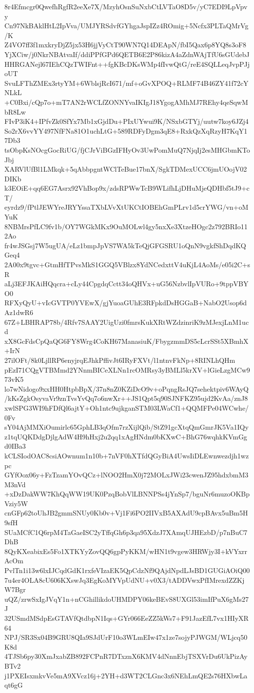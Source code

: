 8r4Efmcgr0QwefhRgfR2eeXe7X/MzyhOsnSuNxbCtLVTaO8D5v/yC7EDI9LpVpvy
Cn97NkBAklHtL2IpVva/UMJYRSdvfGYhgaJspIZz4ROmig+5Ncfx3PLTaQMrVg/K
Z4VO7ff3f1mxkryDjZ5jx53H6jjVyCtT90WN7Q14DEApN/fbI5Qax6p8YQ8s3oF8
YjXCiw/j0NkrNBAtvaIf/ddiPPfGPd6QETB6E2P86kizA4aZdnWAjTfU6sGUdebJ
HHRGANejl67IEhCQzTWIFnt++fgKBcDKsWMp4fIvwQtG/reE4SQLLeqJvpPJjoUT
SvuLFThZMEx3rtyYM+6WblsjRcI671/mf+oGvXPOQ+RLMF74B46ZY41f72cYNLkL
+C0Bxi/cQp7o+mT7AN2rWCLfZONNYvaIKIgJ18YgogAMhMJ7REhy4qeSqwMbR8Lw
FIvP3iK4+IPfvZk0SfYx7Mb1xGjdDu+PIxUYwui9K/NSxbGTYj/uutw7koy6JZj4
So2rX6vvYY497NfFNa81O1uchLtG+589RDFyDgm3qE8+RxkQzXqRzyH7KqY17Db3
tsObpKsNOcgGocRiUG/fjCJrViBGzIFHyOv3UwPomMuQ7NjqIj2esMHGbmKToJbj
XARVlUfBl1LMkqk+5qAbbpgntWClTeBue17bnX/SgkTDMexUCC6jmUOojV02DIKb
k3EOiE+qq6EG7Asrx92VhBop9x/zdsRPWwTcB9WLifhLjDHuMjeQDHbf5tJ9+cT/
eyrdz9/fPtlJEWYreJRYYssaTXbLVvXtUKCtIOBEhGmPLrv1d5crYWG/vn+oMYuK
8NBMrsPfLC9fv1b/OY7WGkMKx9OuMOLwl4gy5nxXe3XtzeHOgc2z792BRIo112Ao
fr4wJSGsj7W5ugUA/eLz1bmpJpVS7WA5kTeQjGFGSRU1oQnN9vgkfShDqdKQGeq4
2A00x9tgvc+GtmHfTPvsMkS1GGQ5VBlzx8YdNCedxttV4uKjL4AoMs/e05i2C+sR
aLj3EFJKAiHQqcra+cLy44CpgdqCctt34oQHVx+uG56NzbvlIpVURo+9tppVBYO0
RFXyQyU+vIcGVTP0YVEwX/gjYuoaGUhE3RFpkdDsHGGaB+NabO2Usop6dAz1dwR6
67Z+LBHRAP78b/4Rfv7SAAY2UigUzi0fmrsKukXRtWZdzinriK9zMJexjLnM1ucd
xX8GcFdsCpQaQG6FY8Wrg4CoKH67ManasiuK/FbygzmmDS5cLcrSSt5XBmhX+IrN
27ilOFt/8k0LjllRP6enyjrqEJhkPffivJt6IRyFXVt/l1ntnvFkNp+8RINLhQHm
pEzI71CQgVTBMmd2YNnmBICeXLNn1rcOMRsy3yBMLl5krXV+lGieLzgMCw973vK5
lo7wNidogo9xxHH0HtpbBpX/37n8nZ0KZiDcO9v+oPqngRsJQ7sehektpiv6WAyQ
/kKsZgkOsyvaVr9znTvsYvQq7o6nwXr++JS1Qpt5q90SJNFKZ95ujd2KvAa/znJ8
xwlSPG3WI9hFDfQl6ajtY+Oh1ntc9ujkganSTM03LWaCf1+QQMFPe04WCwhe/0Fv
sY04AjMMXiOumirlc65GphLB3qOfm7rzXijlQib/StZ91gcXtqQmGmrJK5Va1IQy
z1tqUQKDdgDjlgAdW4H9hHxj2u2qq1xAgHNdm0bKXwC+BhG76wqhkKVmGgd0IBa3
kCLSIodOAC8csiAOwnum1n10b+7nVF0hXTfdQGyBiA4UwsIiDLEwnwezdjh1wzpc
GYfOox06y+FzTzamYOvQCz+lNOO2HmX0j72MOLxJWi23cwenJZ95hdxbmM3M3nVd
+xDzDakWW7KhQqWW19UK0PzqBobVlLBNNPSs4jYnSp7/bguNr6muzoOKBpVziy5W
cnGFp62toUhJB2gmmSNUy0Kb0v+Vj1Fi6PO2IIVxB5AXAdU9cpBAvx5uBm5H9sfH
SUaMCfC1Q6rpM4TaGaeISC2yTffqGh6p3qa95XdzJ7XAmqUJHEzbD/p7nBuC7DhB
8QyKXeabixEs5Fo1XTKYyZovQQ6gpPyKKM/wHN1t9vgew3HRWjy3I+kVYxrrAcOm
PvlTn1i13w6lxIJCqdGdK1rxfeVIzaEK5QpCdzNf9QAjdNpdLJsBD1GUGiAOiQ00
7u4er4OLA8cU606KXswJq3EgKoMYVpUdNU+v0X3/tADDVwxPfIMrexdZZKjW7Bgr
uQZ/zrwSxIgJVqY1n+nCGhillikdoUHMDPY06keBEvS8UXGl53imIfPuX6gMs27J
32USmdMSdpEsGTAVfQtdbpN1Iqs+GYr066EeZZ5kWs7+F91JazEfL7vx1HIyXR64
NPJ/SR3Sx04B9GRU8QIa9SJdUrF10o3WLmEIw47x1ze7sojyPJWGM/WLjcq50K8d
4TJSb6py30XmJxabZB892FCPnR7DTxznX6KMV4dNnnEbjTSXVrDu6UkPizAyBTv2
j1PXEIsxmkvVe5mA9XVcz16j+2YH+d3WT2CLGnc3x6NEhLmQE2s76HXbwLaqt6gG
